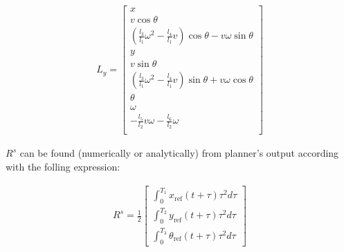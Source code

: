 \documentclass[letterpaper, 10 pt, conference]{ieeeconf}  %
\begin{document}

\begin{eqnarray}
L_y =
\left[\begin{array}{c}
x\\
v\cos\theta\\
\left(\frac{l_3}{l_1}\omega^2 - \frac{l_4}{l_1}v\right)\cos\theta - v\omega\sin\theta\\
y\\
v\sin\theta\\
\left(\frac{l_3}{l_1}\omega^2 - \frac{l_4}{l_1}v\right)\sin\theta + v\omega\cos\theta\\
\theta\\
\omega\\
-\frac{l_5}{l_2}v\omega - \frac{l_6}{l_2}\omega\\
\end{array}\right]
\end{eqnarray}

$R^s$ can be found (numerically or analytically) from planner's output according with the folling expression:

\begin{eqnarray}
R^s =
\frac{1}{2}\left[\begin{array}{c}
\int_0^{T_1}x_{\text{ref}}(t+\tau)\tau^2d\tau\\
\int_0^{T_2}y_{\text{ref}}(t+\tau)\tau^2d\tau\\
\int_0^{T_3}\theta_{\text{ref}}(t+\tau)\tau^2d\tau
\end{array}\right]
\end{eqnarray}
\end{document}
